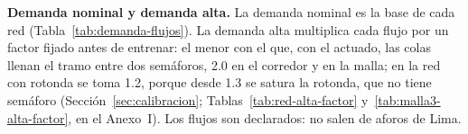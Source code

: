 \noindent\textbf{Demanda nominal y demanda alta.} La demanda nominal es
la base de cada red (Tabla~\ref{tab:demanda-flujos}). La demanda alta
multiplica cada flujo por un factor fijado antes de entrenar: el menor
con el que, con el actuado, las colas llenan el tramo entre dos
semáforos, 2.0 en el corredor y en la malla; en la red con rotonda se
toma 1.2, porque desde 1.3 se satura la rotonda, que no tiene semáforo
(Sección~\ref{sec:calibracion}; Tablas~\ref{tab:red-alta-factor}
y~\ref{tab:malla3-alta-factor}, en el Anexo~I). Los flujos son
declarados: no salen de aforos de Lima.

